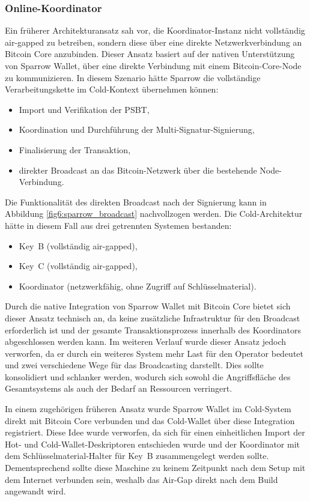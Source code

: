 \subsubsection{Online-Koordinator} \label{sec:alt_Sparrow_broadcast}
Ein früherer Architekturansatz sah vor, die Koordinator-Instanz nicht vollständig air-gapped zu betreiben, sondern diese über eine direkte Netzwerkverbindung an Bitcoin Core anzubinden.
Dieser Ansatz basiert auf der nativen Unterstützung von Sparrow Wallet, über eine direkte Verbindung mit einem Bitcoin-Core-Node zu kommunizieren. In diesem Szenario hätte Sparrow die vollständige Verarbeitungskette im Cold-Kontext übernehmen können:
\begin{itemize}
    \item Import und Verifikation der \ac{PSBT},
    \item Koordination und Durchführung der Multi-Signatur-Signierung,
    \item Finalisierung der Transaktion,
    \item direkter Broadcast an das Bitcoin-Netzwerk über die bestehende Node-Verbindung.
\end{itemize}

Die Funktionalität des direkten Broadcast nach der Signierung kann in Abbildung \ref{fig6:sparrow_broadcast} nachvollzogen werden.
Die Cold-Architektur hätte in diesem Fall aus drei getrennten Systemen bestanden:
\begin{itemize}
    \item Key~B (vollständig air-gapped),
    \item Key~C (vollständig air-gapped),
    \item Koordinator (netzwerkfähig, ohne Zugriff auf Schlüsselmaterial).
\end{itemize}

Durch die native Integration von Sparrow Wallet mit Bitcoin Core bietet sich dieser Ansatz technisch an, da keine zusätzliche Infrastruktur für den Broadcast erforderlich ist und der gesamte Transaktionsprozess innerhalb des Koordinators abgeschlossen werden kann.
Im weiteren Verlauf wurde dieser Ansatz jedoch verworfen, da er durch ein weiteres System mehr Last für den Operator bedeutet und zwei verschiedene Wege für das Broadcasting darstellt. Dies sollte konsolidiert und schlanker werden, wodurch sich sowohl die Angriffsfläche des Gesamtsystems als auch der Bedarf an Ressourcen verringert.

In einem zugehörigen früheren Ansatz wurde Sparrow Wallet im Cold-System direkt mit Bitcoin Core verbunden und das Cold-Wallet über diese Integration registriert. Diese Idee wurde verworfen, da sich für einen einheitlichen Import der Hot- und Cold-Wallet-Deskriptoren entschieden wurde und der Koordinator mit dem Schlüsselmaterial-Halter für Key~B zusammengelegt werden sollte. Dementsprechend sollte diese Maschine zu keinem Zeitpunkt nach dem Setup mit dem Internet verbunden sein, weshalb das Air-Gap direkt nach dem Build angewandt wird.

